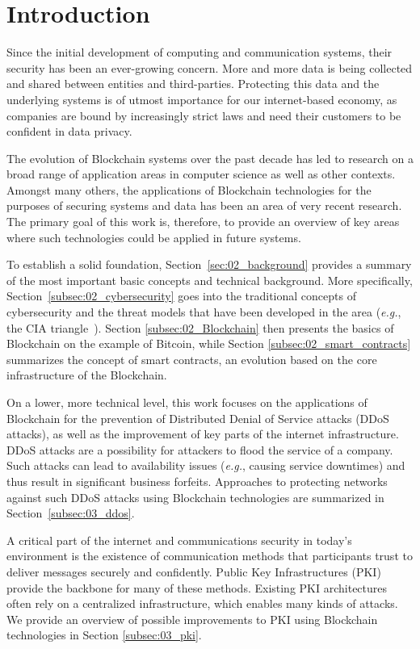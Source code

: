 \section{Introduction}

Since the initial development of computing and communication systems, their security has been an ever-growing concern. More and more data is being collected and shared between entities and third-parties. Protecting this data and the underlying systems is of utmost importance for our internet-based economy, as companies are bound by increasingly strict laws and need their customers to be confident in data privacy.

The evolution of Blockchain systems over the past decade has led to research on a broad range of application areas in computer science as well as other contexts. Amongst many others, the applications of Blockchain technologies for the purposes of securing systems and data has been an area of very recent research. The primary goal of this work is, therefore, to provide an overview of key areas where such technologies could be applied in future systems.

To establish a solid foundation, Section~\ref{sec:02_background} provides a summary of the most important basic concepts and technical background. More specifically, Section~\ref{subsec:02_cybersecurity} goes into the traditional concepts of cybersecurity and the threat models that have been developed in the area (\textit{e.g.}, the CIA triangle~\cite{whitman2011principles}). Section \ref{subsec:02_Blockchain} then presents the basics of Blockchain on the example of Bitcoin, while Section \ref{subsec:02_smart_contracts} summarizes the concept of smart contracts, an evolution based on the core infrastructure of the Blockchain.

On a lower, more technical level, this work focuses on the applications of Blockchain for the prevention of Distributed Denial of Service attacks (DDoS attacks), as well as the improvement of key parts of the internet infrastructure. DDoS attacks are a possibility for attackers to flood the service of a company. Such attacks can lead to availability issues (\textit{e.g.}, causing service downtimes) and thus result in significant business forfeits. Approaches to protecting networks against such DDoS attacks using Blockchain technologies are summarized in Section~\ref{subsec:03_ddos}.

A critical part of the internet and communications security in today's environment is the existence of communication methods that participants trust to deliver messages securely and confidently. Public Key Infrastructures (PKI) provide the backbone for many of these methods. Existing PKI architectures often rely on a centralized infrastructure, which enables many kinds of attacks. We provide an overview of possible improvements to PKI using Blockchain technologies in Section \ref{subsec:03_pki}.

